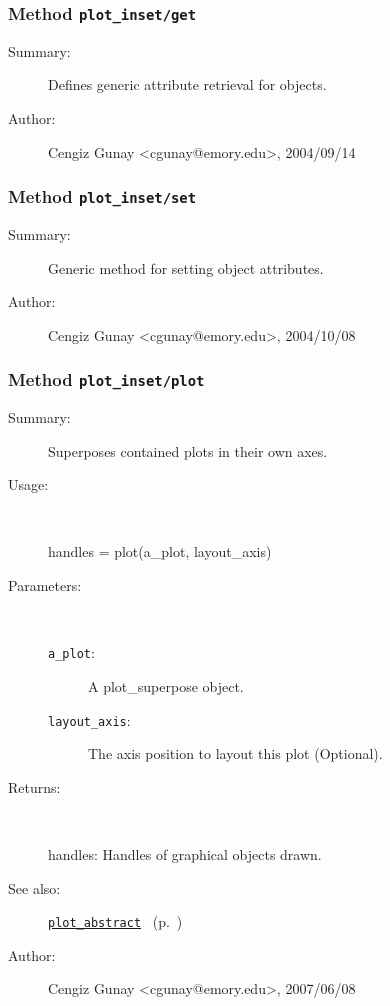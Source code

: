 \subsubsection[Method \texttt{get}]{Method \texttt{plot\_inset/get}}%
%
\label{ref_plot_inset__get}%
\hypertarget{ref_plot_inset__get}{}%
\begin{description}
\item[Summary:]Defines generic attribute retrieval for objects.
%
%
%
%
%
%
%
\item[Author:]%
Cengiz Gunay <cgunay@emory.edu>, 2004/09/14%
\end{description}
\methodline%
\subsubsection[Method \texttt{set}]{Method \texttt{plot\_inset/set}}%
%
\label{ref_plot_inset__set}%
\hypertarget{ref_plot_inset__set}{}%
\begin{description}
\item[Summary:]Generic method for setting object attributes.
%
%
%
%
%
%
%
\item[Author:]%
Cengiz Gunay <cgunay@emory.edu>, 2004/10/08%
\end{description}
\methodline%
\subsubsection[Method \texttt{plot}]{Method \texttt{plot\_inset/plot}}%
%
\label{ref_plot_inset__plot}%
\hypertarget{ref_plot_inset__plot}{}%
\begin{description}
\item[Summary:]Superposes contained plots in their own axes.
%
\item[Usage:]~%
\begin{lyxcode}%
handles = plot(a\_plot, layout\_axis)
%
\end{lyxcode}%
%
%
\item[Parameters:]~
\begin{description}%
\item[\texttt{a\_plot}:]
 A plot\_superpose object.
\item[\texttt{layout\_axis}:]
 The axis position to layout this plot (Optional). 
\end{description}%
%
\item[Returns:]~

	handles: Handles of graphical objects drawn.
%
%
\item[See also:]%
\hyperlink{ref_plot_abstract}{\texttt{plot\_abstract}}%
\ (p.~\pageref{ref_plot_abstract})%
%
%
\item[Author:]%
Cengiz Gunay <cgunay@emory.edu>, 2007/06/08%
\end{description}
\methodline%
